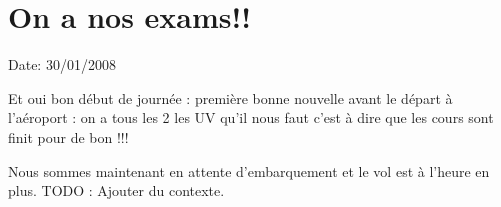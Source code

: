 \section{On a nos exams!!}

Date: 30/01/2008

\begin{multicols}{2}

Et oui bon début de journée : première bonne nouvelle avant le départ à l'aéroport : on a tous les 2 les UV qu'il nous faut c'est à dire que les cours sont finit pour de bon !!!

Nous sommes maintenant en attente d'embarquement et le vol est à l'heure en plus.
TODO : Ajouter du contexte.

\end{multicols}


